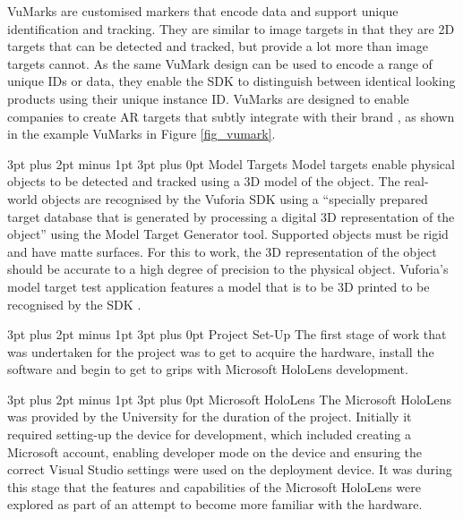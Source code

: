 \documentclass[12pt,a4paper,oneside]{article}
\makeatletter
\renewcommand\paragraph{\@startsection {paragraph}{1}{0mm} %
	                           {3pt plus 2pt minus 1pt} %
	                           {3pt plus 0pt} %
	                           {\normalfont}}
\renewcommand\subsubsection{\@startsection {subsubsection}{1}{0mm} %
	                           {3pt plus 2pt minus 1pt} %
	                           {3pt plus 0pt} %
	                           {\normalfont\bfseries}}
\renewcommand\subsection{\@startsection {subsection}{1}{0mm} %
                               {3pt plus 2pt minus 1pt} %
                               {3pt plus 0pt} %
                               {\large\bfseries}}
\makeatother
\begin{document}
VuMarks are customised markers that encode data and support unique identification and tracking. They are similar to image targets in that they are 2D targets that can be detected and tracked, but provide a lot more than image targets cannot. As the same VuMark design can be used to encode a range of unique IDs or data, they enable the SDK to distinguish between identical looking products using their unique instance ID. VuMarks are designed to enable companies to create AR targets that subtly integrate with their brand \cite{vuforiavumark}, as shown in the example VuMarks in Figure \ref{fig_vumark}.  

\paragraph{Model Targets}
Model targets enable physical objects to be detected and tracked using a 3D model of the object. The real-world objects are recognised by the Vuforia SDK using a ``specially prepared target database that is generated by processing a digital 3D representation of the object'' using the Model Target Generator tool. Supported objects must be rigid and have matte surfaces. For this to work, the 3D representation of the object should be accurate to a high degree of precision to the physical object. Vuforia's model target test application features a model that is to be 3D printed to be recognised by the SDK \cite{vuforiamodeltargets}.

\subsection{Project Set-Up}
The first stage of work that was undertaken for the project was to get to acquire the hardware, install the software and begin to get to grips with Microsoft HoloLens development.

\subsubsection{Microsoft HoloLens}
The Microsoft HoloLens was provided by the University for the duration of the project. Initially it required setting-up the device for development, which included creating a Microsoft account, enabling developer mode on the device and ensuring the correct Visual Studio settings were used on the deployment device. It was during this stage that the features and capabilities of the Microsoft HoloLens were explored as part of an attempt to become more familiar with the hardware.
\end{document}
